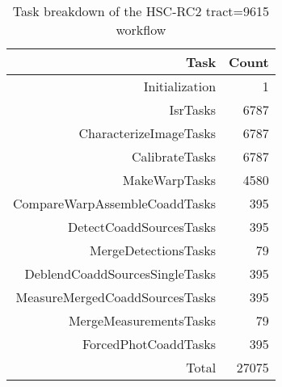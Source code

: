 \begin{longtable} {|r|r|} 
\caption{Task breakdown of the HSC-RC2 tract=9615 workflow \label{tab:taskBreakdown}}\\ 
\hline 
{Task}&{Count}\\ \hline 
Initialization&1\\
IsrTasks&6787\\
CharacterizeImageTasks&6787\\
CalibrateTasks&6787\\
MakeWarpTasks&4580\\
CompareWarpAssembleCoaddTasks&395\\
DetectCoaddSourcesTasks&395\\
MergeDetectionsTasks&79\\
DeblendCoaddSourcesSingleTasks&395\\
MeasureMergedCoaddSourcesTasks&395\\
MergeMeasurementsTasks&79\\
ForcedPhotCoaddTasks&395\\ \hline
Total&27075\\ \hline
\end{longtable} \normalsize
